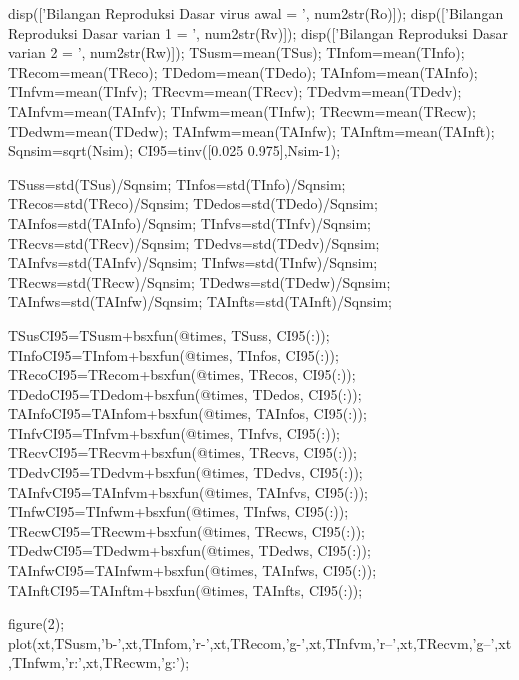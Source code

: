         disp(['Bilangan Reproduksi Dasar virus awal = ', num2str(Ro)]);
        disp(['Bilangan Reproduksi Dasar varian 1 = ', num2str(Rv)]);
        disp(['Bilangan Reproduksi Dasar varian 2 = ', num2str(Rw)]);
        TSusm=mean(TSus);
        TInfom=mean(TInfo);
        TRecom=mean(TReco);
        TDedom=mean(TDedo);
        TAInfom=mean(TAInfo);
        TInfvm=mean(TInfv);
        TRecvm=mean(TRecv);
        TDedvm=mean(TDedv);
        TAInfvm=mean(TAInfv);
        TInfwm=mean(TInfw);
        TRecwm=mean(TRecw);
        TDedwm=mean(TDedw);
        TAInfwm=mean(TAInfw);
        TAInftm=mean(TAInft);
        Sqnsim=sqrt(Nsim);
        CI95=tinv([0.025 0.975],Nsim-1);
        
        TSuss=std(TSus)/Sqnsim;
        TInfos=std(TInfo)/Sqnsim;
        TRecos=std(TReco)/Sqnsim;
        TDedos=std(TDedo)/Sqnsim;
        TAInfos=std(TAInfo)/Sqnsim;
        TInfvs=std(TInfv)/Sqnsim;
        TRecvs=std(TRecv)/Sqnsim;
        TDedvs=std(TDedv)/Sqnsim;
        TAInfvs=std(TAInfv)/Sqnsim;
        TInfws=std(TInfw)/Sqnsim;
        TRecws=std(TRecw)/Sqnsim;
        TDedws=std(TDedw)/Sqnsim;
        TAInfws=std(TAInfw)/Sqnsim;
        TAInfts=std(TAInft)/Sqnsim;
        
        
        TSusCI95=TSusm+bsxfun(@times, TSuss, CI95(:));      
        TInfoCI95=TInfom+bsxfun(@times, TInfos, CI95(:));       
        TRecoCI95=TRecom+bsxfun(@times, TRecos, CI95(:));       
        TDedoCI95=TDedom+bsxfun(@times, TDedos, CI95(:));        
        TAInfoCI95=TAInfom+bsxfun(@times, TAInfos, CI95(:));       
        TInfvCI95=TInfvm+bsxfun(@times, TInfvs, CI95(:));       
        TRecvCI95=TRecvm+bsxfun(@times, TRecvs, CI95(:));        
        TDedvCI95=TDedvm+bsxfun(@times, TDedvs, CI95(:));        
        TAInfvCI95=TAInfvm+bsxfun(@times, TAInfvs, CI95(:));        
        TInfwCI95=TInfwm+bsxfun(@times, TInfws, CI95(:));       
        TRecwCI95=TRecwm+bsxfun(@times, TRecws, CI95(:));        
        TDedwCI95=TDedwm+bsxfun(@times, TDedws, CI95(:));       
        TAInfwCI95=TAInfwm+bsxfun(@times, TAInfws, CI95(:));        
        TAInftCI95=TAInftm+bsxfun(@times, TAInfts, CI95(:));
        
        figure(2);
        plot(xt,TSusm,'b-',xt,TInfom,'r-',xt,TRecom,'g-',xt,TInfvm,'r--',xt,TRecvm,'g--',xt,TInfwm,'r:',xt,TRecwm,'g:');
       
